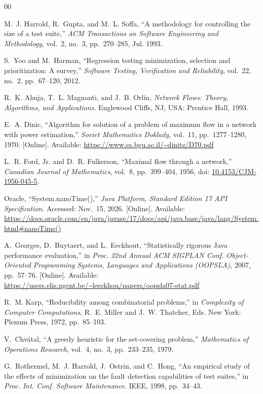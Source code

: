 \documentclass[conference]{IEEEtran}
\theoremstyle{definition}
\theoremstyle{remark}
\begin{document}
\begin{thebibliography}{00}

 M.~J. Harrold, R.~Gupta, and M.~L. Soffa, ``A methodology
for controlling the size of a test suite,'' \emph{ACM Transactions on Software
Engineering and Methodology}, vol.~2, no.~3, pp.~270--285, Jul. 1993.

 S.~Yoo and M.~Harman, ``Regression testing minimization,
selection and prioritization: A survey,'' \emph{Software Testing, Verification
and Reliability}, vol.~22, no.~2, pp.~67--120, 2012.

R.~K. Ahuja, T.~L. Magnanti, and J.~B. Orlin,
\emph{Network Flows: Theory, Algorithms, and Applications}.
Englewood Cliffs, NJ, USA: Prentice Hall, 1993.

E.~A. Dinic, ``Algorithm for solution of a problem of maximum flow in a
network with power estimation,'' \emph{Soviet Mathematics Doklady},
vol.~11, pp.~1277--1280, 1970.
[Online]. Available: \url{https://www.cs.bgu.ac.il/~dinitz/D70.pdf}

L.~R. Ford, Jr. and D.~R. Fulkerson, ``Maximal flow through a network,''
\emph{Canadian Journal of Mathematics}, vol.~8, pp.~399--404, 1956,
doi: \href{https://doi.org/10.4153/CJM-1956-045-5}{10.4153/CJM-1956-045-5}.

Oracle, ``System.nanoTime(),'' \emph{Java Platform, Standard Edition 17
API Specification}. Accessed: Nov.~15, 2026.
[Online]. Available:
\url{https://docs.oracle.com/en/java/javase/17/docs/api/java.base/java/lang/System.html\#nanoTime()}

A.~Georges, D.~Buytaert, and L.~Eeckhout,
``Statistically rigorous Java performance evaluation,''
in \emph{Proc. 22nd Annual ACM SIGPLAN Conf. Object-Oriented Programming
Systems, Languages and Applications (OOPSLA)}, 2007, pp.~57--76.
[Online]. Available:
\url{https://users.elis.ugent.be/~leeckhou/papers/oopsla07-stat.pdf}

 R.~M. Karp, ``Reducibility among combinatorial problems,'' in
\emph{Complexity of Computer Computations}, R.~E. Miller and J.~W. Thatcher,
Eds. New York: Plenum Press, 1972, pp.~85--103.

 V.~Chv{\'a}tal, ``A greedy heuristic for the set-covering
problem,'' \emph{Mathematics of Operations Research}, vol.~4, no.~3,
pp.~233--235, 1979.

 G.~Rothermel, M.~J. Harrold, J.~Ostrin, and C.~Hong,
``An empirical study of the effects of minimization on the fault detection
capabilities of test suites,'' in \emph{Proc. Int. Conf. Software
Maintenance}. IEEE, 1998, pp.~34--43.

\end{thebibliography}
\end{document}
